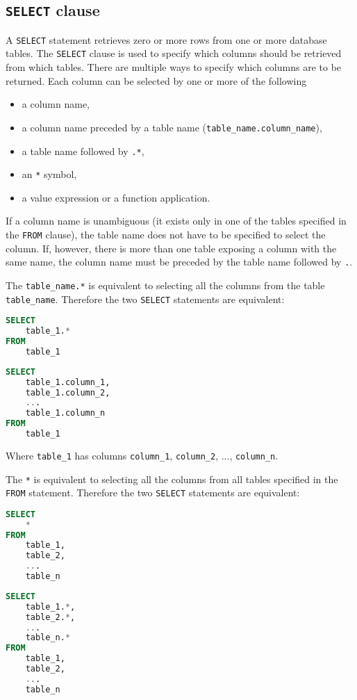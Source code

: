 \documentclass[magisterska,en]{pracamgr}
\newcommand{\code}[1]{\texttt{#1}}
\begin{document}
\subsection{\code{SELECT} clause}

A \code{SELECT} statement retrieves zero or more rows from one or more database tables. The \code{SELECT} clause is used to specify which columns should be retrieved from which tables. There are multiple ways to specify which columns are to be returned. Each column can be selected by one or more of the following
\begin{itemize}
    \item a column name,
    \item a column name preceded by a table name (\code{table_name.column_name}),
    \item a table name followed by \code{.*},
    \item an \code{*} symbol,
    \item a value expression or a function application.
\end{itemize}

If a column name is unambiguous (it exists only in one of the tables specified in the \code{FROM} clause), the table name does not have to be specified to select the column. If, however, there is more than one table exposing a column with the same name, the column name must be preceded by the table name followed by \code{.}. 

The \code{table_name.*} is equivalent to selecting all the columns from the table \code{table_name}. Therefore the two \code{SELECT} statements are equivalent:

\begin{lstlisting}[language=SQL]
SELECT
    table_1.*
FROM
    table_1
\end{lstlisting}
\begin{lstlisting}[language=SQL]
SELECT
    table_1.column_1,
    table_1.column_2,
    ...
    table_1.column_n
FROM
    table_1

\end{lstlisting}
Where \code{table_1} has columns \code{column_1}, \code{column_2}, ..., \code{column_n}.

The \code{*} is equivalent to selecting all the columns from all tables specified in the \code{FROM} statement. Therefore the two \code{SELECT} statements are equivalent:

\begin{lstlisting}[language=SQL]
SELECT
    *
FROM
    table_1,
    table_2,
    ...
    table_n
\end{lstlisting}
\begin{lstlisting}[language=SQL]
SELECT
    table_1.*,
    table_2.*,
    ...
    table_n.*
FROM
    table_1,
    table_2,
    ...
    table_n

\end{lstlisting}
\end{document}
